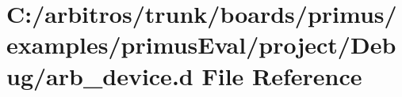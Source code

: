 \hypertarget{boards_2primus_2examples_2primus_eval_2project_2_debug_2arb__device_8d}{\section{C\-:/arbitros/trunk/boards/primus/examples/primus\-Eval/project/\-Debug/arb\-\_\-device.d File Reference}
\label{boards_2primus_2examples_2primus_eval_2project_2_debug_2arb__device_8d}
}
